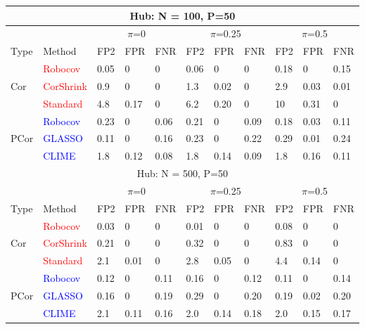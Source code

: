 \documentclass{bioinfo}
\begin{document}
\begin{table}[h]
\begin{tabular}[!t]{|p{0.5cm}|p{1.1cm}|p{0.4cm}|p{0.45cm}|p{0.45cm}|p{0.4cm}|p{0.45cm}|p{0.45cm}|p{0.4cm}|p{0.45cm}|p{0.45cm}|}
\multicolumn{11}{|c|}{Hub: N = 100, P=50} \\ \hline
& & \multicolumn{3}{c|}{$\pi$=0} & \multicolumn{3}{c|}{$\pi$=0.25} & \multicolumn{3}{c|}{$\pi$=0.5} \\ \hline
Type & Method & FP2 & FPR & FNR &  FP2 & FPR & FNR & FP2 & FPR & FNR \\ \hline
\multirow{ 3}{*}{Cor} & \textcolor{red}{Robocov} & 0.05 &   0 &   0 & 0.06 &   0 &   0 & 0.18 &   0 & 0.15\\
& \textcolor{red}{CorShrink} & 0.9 &   0 &   0 & 1.3 & 0.02 &   0 & 2.9 & 0.03 & 0.01 \\
& \textcolor{red}{Standard} & 4.8 & 0.17 &   0 & 6.2 & 0.20 &  0 &  10 & 0.31 &  0 \\ \hline 
\multirow{ 3}{*}{PCor} & \textcolor{blue}{Robocov} & 0.23 & 0 & 0.06 & 0.21 & 0 & 0.09 & 0.18 & 0.03 & 0.11 \\
& \textcolor{blue}{GLASSO} & 0.11 & 0 & 0.16 & 0.23 & 0 & 0.22 & 0.29 & 0.01 & 0.24 \\
& \textcolor{blue}{CLIME}  & 1.8 & 0.12 & 0.08 & 1.8 & 0.14 & 0.09  & 1.8 & 0.16 & 0.11 \\ \hline 
\multicolumn{11}{|c|}{Hub: N = 500, P=50} \\ \hline
& & \multicolumn{3}{c|}{$\pi$=0} & \multicolumn{3}{c|}{$\pi$=0.25} & \multicolumn{3}{c|}{$\pi$=0.5} \\ \hline
Type & Method & FP2 & FPR & FNR &  FP2 & FPR & FNR & FP2 & FPR & FNR \\ \hline
\multirow{ 3}{*}{Cor} & \textcolor{red}{Robocov}  & 0.03 &   0 &   0 & 0.01 &   0 &   0 & 0.08 &   0 &   0  \\
& \textcolor{red}{CorShrink} & 0.21 &   0 &   0 & 0.32 &   0 &   0 & 0.83 &   0 &   0\\
& \textcolor{red}{Standard} & 2.1 & 0.01 &   0 & 2.8 & 0.05 &   0 & 4.4 & 0.14 &   0 \\ \hline 
\multirow{ 3}{*}{PCor} & \textcolor{blue}{Robocov} & 0.12 & 0 & 0.11 & 0.16 & 0 & 0.12 & 0.11 & 0 & 0.14 \\
& \textcolor{blue}{GLASSO} & 0.16 & 0 & 0.19 & 0.29 & 0 & 0.20 & 0.19 & 0.02 & 0.20 \\
& \textcolor{blue}{CLIME} & 2.1 & 0.11 & 0.16 & 2.0 & 0.14 & 0.18 & 2.0 & 0.15 & 0.17 \\ \hline
\end{tabular}
\end{table}
 
\end{document}
